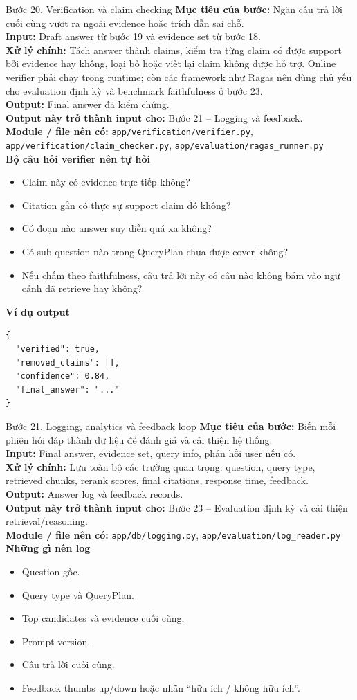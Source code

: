 \documentclass[12pt,a4paper]{article}
\newcommand{\stepgoal}[1]{\textbf{Mục tiêu của bước:} #1\\}
\newcommand{\stepinput}[1]{\textbf{Input:} #1\\}
\newcommand{\stepprocess}[1]{\textbf{Xử lý chính:} #1\\}
\newcommand{\stepoutput}[1]{\textbf{Output:} #1\\}
\newcommand{\stepnext}[1]{\textbf{Output này trở thành input cho:} #1\\}
\newcommand{\stepmodules}[1]{\textbf{Module / file nên có:} #1\\}
\begin{document}
\begin{stepbox}{Bước 20. Verification và claim checking}
\stepgoal{Ngăn câu trả lời cuối cùng vượt ra ngoài evidence hoặc trích dẫn sai chỗ.}
\stepinput{Draft answer từ bước 19 và evidence set từ bước 18.}
\stepprocess{Tách answer thành claims, kiểm tra từng claim có được support bởi evidence hay không, loại bỏ hoặc viết lại claim không được hỗ trợ. Online verifier phải chạy trong runtime; còn các framework như Ragas nên dùng chủ yếu cho evaluation định kỳ và benchmark faithfulness ở bước 23.}
\stepoutput{Final answer đã kiểm chứng.}
\stepnext{Bước 21 -- Logging và feedback.}
\stepmodules{\texttt{app/verification/verifier.py}, \texttt{app/verification/claim\_checker.py}, \texttt{app/evaluation/ragas\_runner.py}}

\textbf{Bộ câu hỏi verifier nên tự hỏi}
\begin{itemize}
    \item Claim này có evidence trực tiếp không?
    \item Citation gắn có thực sự support claim đó không?
    \item Có đoạn nào answer suy diễn quá xa không?
    \item Có sub-question nào trong QueryPlan chưa được cover không?
    \item Nếu chấm theo faithfulness, câu trả lời này có câu nào không bám vào ngữ cảnh đã retrieve hay không?
\end{itemize}

\textbf{Ví dụ output}
\begin{lstlisting}
{
  "verified": true,
  "removed_claims": [],
  "confidence": 0.84,
  "final_answer": "..."
}
\end{lstlisting}
\end{stepbox}

\begin{stepbox}{Bước 21. Logging, analytics và feedback loop}
\stepgoal{Biến mỗi phiên hỏi đáp thành dữ liệu để đánh giá và cải thiện hệ thống.}
\stepinput{Final answer, evidence set, query info, phản hồi user nếu có.}
\stepprocess{Lưu toàn bộ các trường quan trọng: question, query type, retrieved chunks, rerank scores, final citations, response time, feedback.}
\stepoutput{Answer log và feedback records.}
\stepnext{Bước 23 -- Evaluation định kỳ và cải thiện retrieval/reasoning.}
\stepmodules{\texttt{app/db/logging.py}, \texttt{app/evaluation/log\_reader.py}}

\textbf{Những gì nên log}
\begin{itemize}
    \item Question gốc.
    \item Query type và QueryPlan.
    \item Top candidates và evidence cuối cùng.
    \item Prompt version.
    \item Câu trả lời cuối cùng.
    \item Feedback thumbs up/down hoặc nhãn ``hữu ích / không hữu ích''.
\end{itemize}
\end{stepbox}
\end{document}
